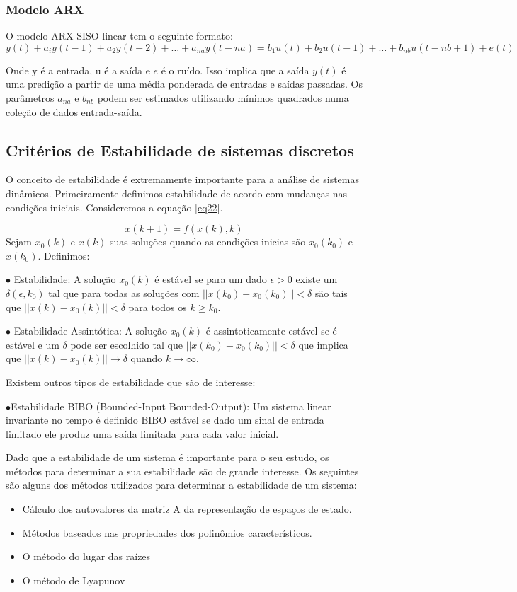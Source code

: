 \subsubsection{Modelo ARX}
O modelo ARX SISO linear tem o seguinte formato:
\begin{equation}\label{ARXModel}
	y(t)+a_iy(t-1)+a_2y(t-2)+\dots+a_{na}y(t-na)=
	b_1u(t)+b_2u(t-1)+\dots+b_{nb}u(t-nb+1)+e(t)
\end{equation}

Onde y é a entrada, u é a saída e $e$ é o ruído. Isso implica que a saída $y(t)$ é uma predição a partir de uma média ponderada de entradas e saídas passadas. Os parâmetros $a_{na}$ e $b_{nb}$ podem ser estimados utilizando mínimos quadrados numa coleção de dados entrada-saída.

\subsection{Critérios de Estabilidade de sistemas discretos}

O conceito de estabilidade é extremamente importante para a análise de sistemas dinâmicos. Primeiramente definimos  estabilidade de acordo com mudanças nas condições iniciais. Consideremos a equação \ref{eq22}.

\begin{equation} \label{eq22}
x(k+1)=f(x(k),k)
\end{equation}
Sejam $x_0(k)$ e $x(k)$ suas soluções quando as condições inicias são $x_0(k_0)$ e $x(k_0)$. Definimos:


$\bullet$ Estabilidade: A solução $x_0(k)$ é estável se para um dado $\epsilon>0$ existe um $\delta(\epsilon,k_0)$ tal que para todas as soluções com $||x(k_0)-x_0(k_0)||<\delta$ são tais que $||x(k)-x_0(k)||<\delta$ para todos os $k \geqslant k_0$.


$\bullet$ Estabilidade Assintótica: A solução $x_0(k)$ é assintoticamente estável se é estável e um $\delta$ pode ser escolhido tal que  $||x(k_0)-x_0(k_0)||<\delta$ que implica que $||x(k)-x_0(k)||\to\delta$ quando $k \to \infty$.


Existem outros tipos de estabilidade que são de interesse:


$\bullet$Estabilidade BIBO (Bounded-Input Bounded-Output): Um sistema linear invariante no tempo é definido BIBO estável se dado um sinal de entrada limitado ele produz uma saída limitada para cada valor inicial.


Dado que a estabilidade de um sistema é importante para o seu estudo, os métodos para determinar a sua estabilidade são de grande interesse. Os seguintes são alguns dos métodos utilizados para determinar a estabilidade de um sistema:
\begin{itemize}
	\item Cálculo dos autovalores da matriz A da representação de espaços de estado.
	\item Métodos baseados nas propriedades dos polinômios característicos.
	\item O método do lugar das raízes
	\item O método de Lyapunov
\end{itemize}

